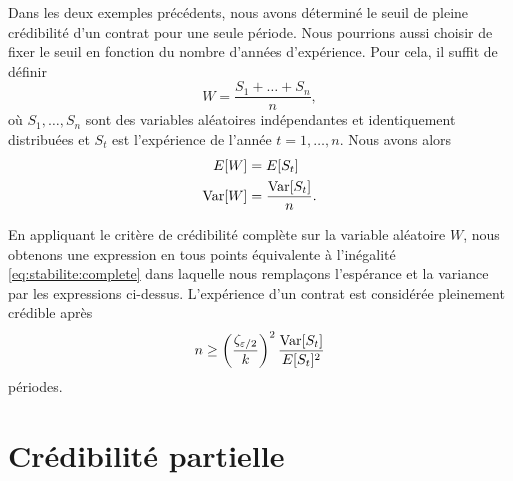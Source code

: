
Dans les deux exemples précédents, nous avons déterminé le seuil de
pleine crédibilité d'un contrat pour une seule période. Nous pourrions
aussi choisir de fixer le seuil en fonction du nombre d'années
d'expérience. Pour cela, il suffit de définir
\begin{equation*}
  W = \frac{S_1 + \dots + S_n}{n},
\end{equation*}
où $S_1, \dots, S_n$ sont des variables aléatoires indépendantes et
identiquement distribuées et $S_t$ est l'expérience de l'année
$t = 1, \dots, n$. Nous avons alors
\begin{align*}
  E [ W ] &= E [ S_t ] \\
  \operatorname{Var} [ W ] &= \frac{\operatorname{Var} [ S_t ]}{n}.
\end{align*}

En appliquant le critère de crédibilité complète sur la variable
aléatoire $W$, nous obtenons une expression en tous points équivalente
à l'inégalité \eqref{eq:stabilite:complete} dans laquelle nous
remplaçons l'espérance et la variance par les expressions ci-dessus.
L'expérience d'un contrat est considérée pleinement crédible après
\begin{equation}
  \label{eq:stabilite:complete_nombre_annees}
  n \geq
  \left(
    \frac{\zeta_{\varepsilon/2}}{k}
  \right)^2
  \frac{\operatorname{Var} [ S_t ]}{E [ S_t ]^2}
\end{equation}
périodes.




\section{Crédibilité partielle}
\label{sec:stabilite:partielle}

